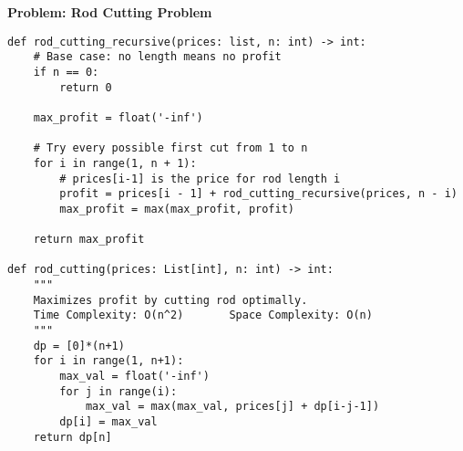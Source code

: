 \noindent\textbf{Problem: Rod Cutting Problem}
\begin{verbatim}
def rod_cutting_recursive(prices: list, n: int) -> int:
    # Base case: no length means no profit
    if n == 0:
        return 0

    max_profit = float('-inf')

    # Try every possible first cut from 1 to n
    for i in range(1, n + 1):
        # prices[i-1] is the price for rod length i
        profit = prices[i - 1] + rod_cutting_recursive(prices, n - i)
        max_profit = max(max_profit, profit)

    return max_profit

def rod_cutting(prices: List[int], n: int) -> int:
    """
    Maximizes profit by cutting rod optimally.
    Time Complexity: O(n^2)       Space Complexity: O(n)
    """
    dp = [0]*(n+1)
    for i in range(1, n+1):
        max_val = float('-inf')
        for j in range(i):
            max_val = max(max_val, prices[j] + dp[i-j-1])
        dp[i] = max_val
    return dp[n]
\end{verbatim}

